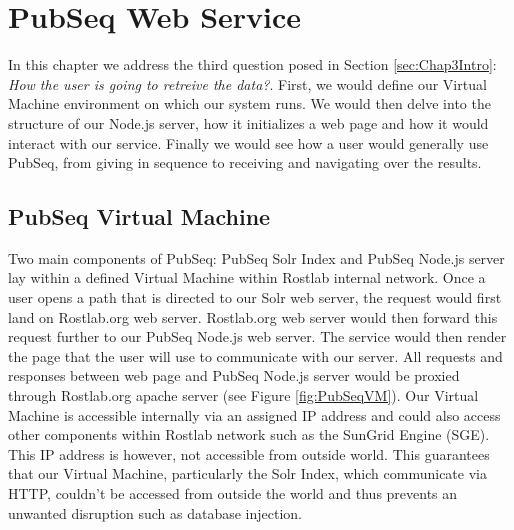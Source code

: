 
\chapter{PubSeq Web Service} %

\label{Chapter6} %


In this chapter we address the third question posed in Section \ref{sec:Chap3Intro}: \textit{How the user is going to \textit{retreive} the data?}. First, we would define our Virtual Machine environment on which our system runs. We would then delve into the structure of our Node.js server, how it initializes a web page and how it would interact with our service. Finally we would see how a user would generally use PubSeq, from giving in sequence to receiving and navigating over the results.


\section{PubSeq Virtual Machine}

Two main components of PubSeq: PubSeq Solr Index and PubSeq Node.js server lay within a defined Virtual Machine within Rostlab internal network. Once a user opens a path that is directed to our Solr web server, the request would first land on Rostlab.org web server. Rostlab.org web server would then forward this request further to our PubSeq Node.js web server. The service would then render the page that the user will use to communicate with our server. All requests and responses between web page and PubSeq Node.js server would be proxied through Rostlab.org apache server (see Figure \ref{fig:PubSeqVM}). Our Virtual Machine is accessible internally via an assigned IP address and could also access other components within Rostlab network such as the SunGrid Engine (SGE). This IP address is however, not accessible from outside world. This guarantees that our Virtual Machine, particularly the Solr Index, which communicate via HTTP, couldn't be accessed from outside the world and thus prevents an unwanted disruption such as database injection.

